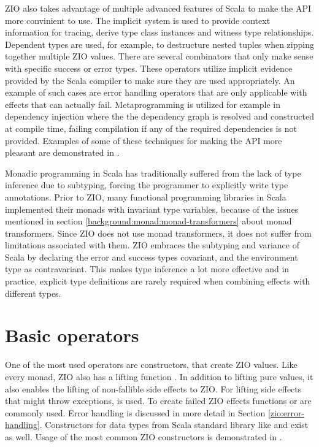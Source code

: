 ZIO also takes advantage of multiple advanced features of Scala to make the API more convinient to use. The implicit system is used to provide context information for tracing, derive type class instances and witness type relationships. Dependent types are used, for example, to destructure nested tuples when zipping together multiple ZIO values. There are several combinators that only make sense with specific success or error types. These operators utilize implicit evidence provided by the Scala compiler to make sure they are used appropriately. An example of such cases are error handling operators that are only applicable with effects that can actually fail. Metaprogramming is utilized for example in dependency injection where the the dependency graph is resolved and constructed at compile time, failing compilation if any of the required dependencies is not provided. Examples of some of these techniques for making the API more pleasant are demonstrated in .



Monadic programming in Scala has traditionally suffered from the lack of type inference due to subtyping, forcing the programmer to explicitly write type annotations. Prior to ZIO, many functional programming libraries in Scala implemented their monads with invariant type variables, because of the issues mentioned in section \ref{background:monad:monad-transformers} about monad transformers. Since ZIO does not use monad transformers, it does not suffer from limitations associated with them. ZIO embraces the subtyping and variance of Scala by declaring the error and success types covariant, and the environment type as contravariant. This makes type inference a lot more effective and in practice, explicit type definitions are rarely required when combining effects with different types.


\section{Basic operators}
One of the most used operators are constructors, that create ZIO values. Like every monad, ZIO also has a lifting function . In addition to lifting pure values, it also enables the lifting of non-fallible side effects to ZIO.  For lifting side effects that might throw exceptions,  is used. To create failed ZIO effects functions  or  are commonly used. Error handling is discussed in more detail in Section \ref{zio:error-handling}. Constructors for data types from Scala standard library like  and  exist as well. Usage of the most common ZIO constructors is demonstrated in .

